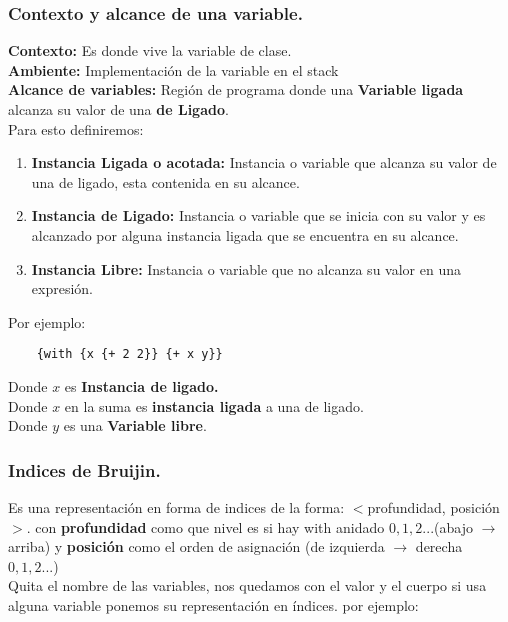 \documentclass[12pt]{article}
\begin{document}
{\color{blue} \subsubsection*{Contexto y alcance de una variable.}}
\vspace{-0.5em}
\textbf{Contexto:} Es donde vive la variable de clase.\\
\textbf{Ambiente:} Implementación de la variable en el stack\\
\textbf{Alcance de variables:} Región de programa donde una \textbf{Variable ligada} alcanza su valor de una \textbf{de Ligado}.\\
Para esto definiremos:\\
\begin{enumerate}
    \item \textbf{Instancia Ligada o acotada:} Instancia o variable que alcanza su valor de una de ligado, esta contenida en su alcance.
    \item \textbf{Instancia de Ligado:} Instancia o variable que se inicia con su valor y es alcanzado por alguna instancia ligada que se encuentra en su alcance.
    \item \textbf{Instancia Libre:} Instancia o variable que no alcanza su valor en una expresión.
\end{enumerate}
Por ejemplo:\\

\begin{lstlisting}
    {with {x {+ 2 2}} {+ x y}}
\end{lstlisting}
Donde $x$ es \textbf{Instancia de ligado.}\\
Donde $x$ en la suma es \textbf{instancia ligada} a una de ligado.\\
Donde $y$ es una \textbf{Variable libre}.

{\color{blue} \subsubsection*{Indices de Bruijin.}}
\vspace{-0.5em}
Es una representación en forma de indices de la forma: $<$profundidad, posición$>$. con \textbf{profundidad} como que nivel es si hay with anidado $0,1,2...$(abajo $\to$ arriba) y \textbf{posición} como el orden de asignación (de izquierda $\to$ derecha $0,1,2...$)\\
Quita el nombre de las variables, nos quedamos con el valor y el cuerpo si usa alguna variable ponemos su representación en índices. por ejemplo:\\
\end{document}
